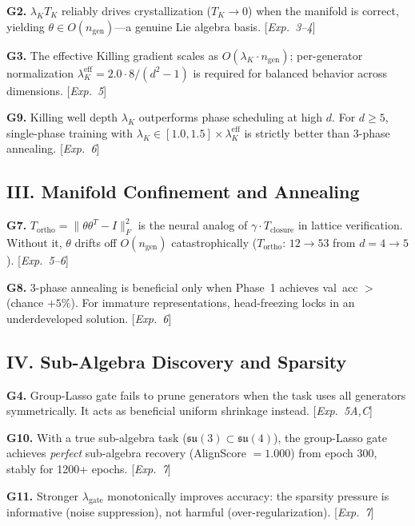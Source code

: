 \documentclass[11pt,a4paper]{article}
\newcommand{\fksu}{\mathfrak{su}}
\newcommand{\TK}{T_K}
\newcommand{\Tortho}{T_{\mathrm{ortho}}}
\newcommand{\Tclosure}{T_{\mathrm{closure}}}
\newcommand{\ngen}{n_{\mathrm{gen}}}
\theoremstyle{definition}
\begin{document}
\noindent\textbf{G2.} $\lambda_K \TK$ reliably drives crystallization ($\TK \to 0$) when the 
manifold is correct, yielding $\theta \in O(\ngen)$---a genuine Lie algebra basis. 
[\emph{Exp.~3--4}]

\noindent\textbf{G3.} The effective Killing gradient scales as $O(\lambda_K \cdot \ngen)$; 
per-generator normalization $\lambda_K^{\mathrm{eff}} = 2.0 \cdot 8/(d^2-1)$ is 
required for balanced behavior across dimensions. [\emph{Exp.~5}]

\noindent\textbf{G9.} Killing well depth $\lambda_K$ outperforms phase scheduling at high $d$. 
For $d \geq 5$, single-phase training with 
$\lambda_K \in [1.0, 1.5] \times \lambda_K^{\mathrm{eff}}$ is strictly better than 
3-phase annealing. [\emph{Exp.~6}]

\subsection{III. Manifold Confinement and Annealing}

\noindent\textbf{G7.} $\Tortho = \|\theta\theta^T - I\|_F^2$ is the neural analog of 
$\gamma \cdot \Tclosure$ in lattice verification. Without it, $\theta$ drifts off 
$O(\ngen)$ catastrophically ($\Tortho$: $12 \to 53$ from $d = 4 \to 5$). 
[\emph{Exp.~5--6}]

\noindent\textbf{G8.} 3-phase annealing is beneficial only when Phase~1 achieves 
val~acc $>$ (chance $+ 5\%$). For immature representations, head-freezing locks in 
an underdeveloped solution. [\emph{Exp.~6}]

\subsection{IV. Sub-Algebra Discovery and Sparsity}

\noindent\textbf{G4.} Group-Lasso gate fails to prune generators when the task uses all generators 
symmetrically. It acts as beneficial uniform shrinkage instead. [\emph{Exp.~5A,C}]

\noindent\textbf{G10.} With a true sub-algebra task ($\fksu(3) \subset \fksu(4)$), the 
group-Lasso gate achieves \emph{perfect} sub-algebra recovery (AlignScore $= 1.000$) 
from epoch 300, stably for 1200+ epochs. [\emph{Exp.~7}]

\noindent\textbf{G11.} Stronger $\lambda_{\mathrm{gate}}$ monotonically improves accuracy: the 
sparsity pressure is informative (noise suppression), not harmful (over-regularization). 
[\emph{Exp.~7}]
\end{document}
